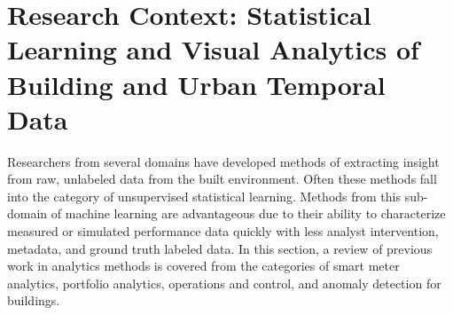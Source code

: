 \section{Research Context: Statistical Learning and Visual Analytics of Building and Urban Temporal Data}
\label{sec:litreview}

Researchers from several domains have developed methods of extracting insight from raw, unlabeled data from the built environment. Often these methods fall into the category of unsupervised statistical learning. Methods from this sub-domain of machine learning are advantageous due to their ability to characterize measured or simulated performance data quickly with less analyst intervention, metadata, and ground truth labeled data. In this section, a review of previous work in analytics methods is covered from the categories of smart meter analytics, portfolio analytics, operations and control, and anomaly detection for buildings. 